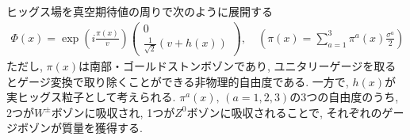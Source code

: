 ヒッグス場を真空期待値の周りで次のように展開する
\begin{align}
  \Phi(x) = \exp\left(i\frac{\pi(x)}{v}\right)\left(
  \begin{array}{c}
    0 \\
    \frac{1}{\sqrt{2}}\left(v + h(x)\right)
  \end{array}
\right),\quad \left(\pi(x) = \sum_{a=1}^3\pi^a(x)\frac{\sigma^a}{2}\right)\label{higgs}
\end{align}
ただし, $\pi(x)$は南部・ゴールドストンボゾンであり, ユニタリーゲージを取るとゲージ変換で取り除くことができる非物理的自由度である.
一方で, $h(x)$が実ヒッグス粒子として考えられる.
$\pi^a(x),\,(a=1,2,3)$の3つの自由度のうち,  2つが$W^\pm$ボゾンに吸収され, 1つが$Z^0$ボゾンに吸収されることで, それぞれのゲージボゾンが質量を獲得する.

